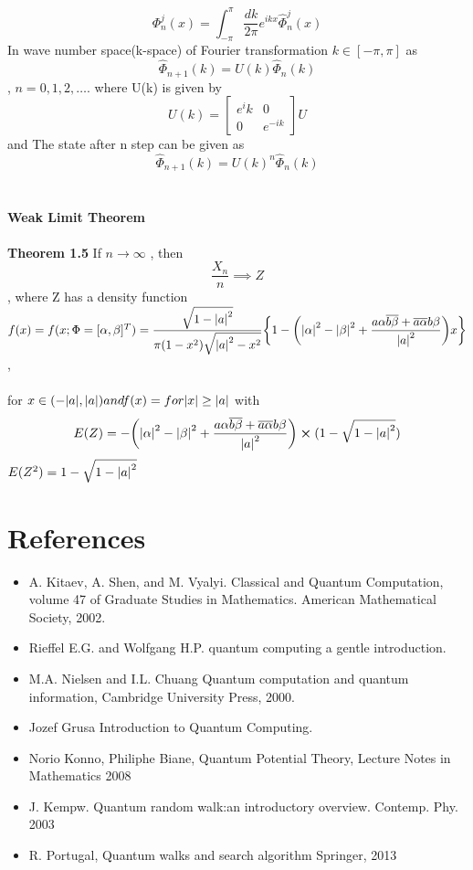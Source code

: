 \documentclass[11 pt]{article}
\theoremstyle{definition}
\theoremstyle{remark}
\begin{document}
$$
\Phi_{n}^{j}(x) = \int_{-\pi}^{\pi} \frac{dk}{2\pi}e^{ikx}\hat{\Phi}_{n}^{j}(x)
$$
In wave number space(k-space) of Fourier transformation $k \in [-\pi,\pi]$ as $$ \hat{\Phi}_{n+1}(k) = U(k)\hat{\Phi}_n(k)$$ , $n=0,1,2, \hdots$.
where U(k) is given by
$$
U(k) = \begin{bmatrix}
    e^ik & 0\\
    0 & e^{-ik}
\end{bmatrix}U
$$
and The state after n step can be given as 
$$
\hat{\Phi}_{n+1}(k) = U(k)^{n}\hat{\Phi}_n(k)
$$
\\
\\
\textbf{Weak Limit Theorem}\\
\\
\textbf{Theorem 1.5} If $n \rightarrow \infty$ , then 
                        $$ \frac{X_n}{n} \implies Z$$,
where Z has a density function\\

 $f(x) = f(x ; \Phi = [\alpha, \beta]^T)
 = \dfrac{\sqrt{1-\abs{a}^2}}{\pi(1-x^2)\sqrt{\abs{a}^2 - x^2}}
 \bigg \{
 1-\bigg(\abs{\alpha}^2 -\abs{\beta}^2 +
 \dfrac{a\alpha\overline{b\beta} + \overline{a\alpha}b\beta}{\abs{a}^2}\bigg)x\bigg \}$, \\
 \\
 for $ x \in (-\abs{a},\abs{a}) and f(x) =  for \abs{x} \geq \abs{a}$ with\\
 $$E(Z) = -\bigg(\abs{\alpha}^2 -\abs{\beta}^2 + \dfrac{a\alpha\overline{b\beta} + \overline{a\alpha}b\beta}{\abs{a}^2}\bigg) \cross (1-\sqrt{1-\abs{a}^2})$$
 \hspace{3.25cm}$E(Z^2) = 1 - \sqrt{1-\abs{a}^2}$
\\


\section{References}
\begin{itemize}
\item A. Kitaev, A. Shen, and M. Vyalyi. Classical and Quantum Computation, volume 47 of Graduate Studies in Mathematics. American Mathematical Society, 2002.
\item Rieffel E.G. and Wolfgang H.P. quantum computing a gentle introduction.
\item M.A. Nielsen and I.L. Chuang Quantum computation and quantum information, Cambridge University Press, 2000.
\item Jozef Grusa Introduction to Quantum Computing.
\item Norio Konno, Philiphe Biane, Quantum Potential Theory, Lecture Notes in Mathematics 2008
\item J. Kempw. Quantum random walk:an introductory overview. Contemp. Phy. 2003
\item R. Portugal, Quantum walks and search algorithm Springer, 2013
\end{itemize}
\end{document}
